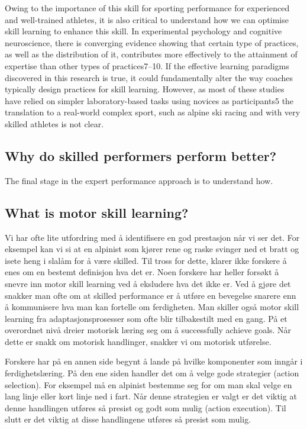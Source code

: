 \documentclass[letterpaper,10pt]{article}
\begin{document}
Owing to the importance of this skill for sporting performance for experienced and well-trained athletes, it is also critical to understand how we can optimise skill learning to enhance this skill. In experimental psychology and cognitive neuroscience, there is converging evidence showing that certain type of practices, as well as the distribution of it, contributes more effectively to the attainment of expertise than other types of practices7–10. If the effective learning paradigms discovered in this research is true, it could fundamentally alter the way coaches typically design practices for skill learning. However, as most of these studies have relied on simpler laboratory-based tasks using novices as participants5 the translation to a real-world complex sport, such as alpine ski racing and with very skilled athletes is not clear. 


\subsection{Why do skilled performers perform better?}
The final stage in the expert performance approach is to understand how.

\subsection{What is motor skill learning?}
Vi har ofte lite utfordring med å identifisere en god prestasjon når vi ser det. For eksempel kan vi si at en alpinist som kjører rene og raske svinger ned et bratt og isete heng i slalåm for å være skilled. Til tross for dette, klarer ikke forskere å enes om en bestemt definisjon hva det er. Noen forskere har heller forsøkt å snevre inn motor skill learning ved å eksludere hva det ikke er. Ved å gjøre det snakker man ofte om at skilled performance er å utføre en bevegelse snarere enn å kommunisere hva man kan fortelle om ferdigheten. Man skiller også motor skill learning fra adaptasjonsprosesser som ofte blir tilbakestilt med en gang. På et overordnet nivå dreier motorisk læring seg om å successfully achieve goals. Når dette er snakk om motorisk handlinger, snakker vi om motorisk utførelse.

Forskere har på en annen side begynt å lande på hvilke komponenter som inngår i ferdighetslæring. På den ene siden handler det om å velge gode strategier (action selection). For eksempel må en alpinist bestemme seg for om man skal velge en lang linje eller kort linje ned i fart. Når denne strategien er valgt er det viktig at denne handlingen utføres så presist og godt som mulig (action execution). Til slutt er det viktig at disse handlingene utføres så presist som mulig. 
\end{document}
